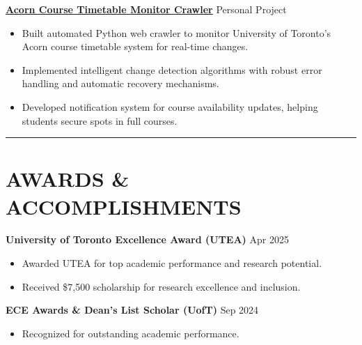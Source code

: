 \documentclass[letterpaper,10pt]{article}
\begin{document}
\vspace{0.2cm}
\noindent\href{https://github.com/Ken-2511/AcornCarwler}{\uline{
\textbf{Acorn Course Timetable Monitor Crawler}}} \hfill Personal Project
\begin{itemize}[leftmargin=0.2in]
    \item Built automated Python web crawler to monitor University of Toronto's Acorn course timetable system for real-time changes.
    \item Implemented intelligent change detection algorithms with robust error handling and automatic recovery mechanisms.
    \item Developed notification system for course availability updates, helping students secure spots in full courses.
\end{itemize}

\noindent\rule{\linewidth}{1pt}

\section*{\textbf{AWARDS \& ACCOMPLISHMENTS}}

\noindent\textbf{University of Toronto Excellence Award (UTEA)} \hfill Apr 2025
\begin{itemize}[leftmargin=0.2in]
    \item Awarded UTEA for top academic performance and research potential.
    \item Received \$7,500 scholarship for research excellence and inclusion.
\end{itemize}

\vspace{0.2cm}
\noindent\textbf{ECE Awards \& Dean's List Scholar (UofT)} \hfill Sep 2024
\begin{itemize}[leftmargin=0.2in]
    \item Recognized for outstanding academic performance.
\end{itemize}
\end{document}
